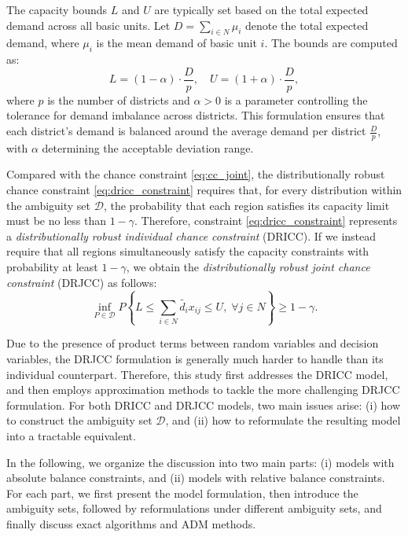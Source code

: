 \documentclass[preprint,12pt,authoryear]{elsarticle}
\begin{document}
The capacity bounds $L$ and $U$ are typically set based on the total expected demand across all basic units. Let $D = \sum_{i \in N} \mu_i$ denote the total expected demand, where $\mu_i$ is the mean demand of basic unit $i$. The bounds are computed as:
\begin{equation}
L = (1 - \alpha) \cdot \frac{D}{p}, \quad U = (1 + \alpha) \cdot \frac{D}{p},
\end{equation}
where $p$ is the number of districts and $\alpha > 0$ is a parameter controlling the tolerance for demand imbalance across districts. This formulation ensures that each district's demand is balanced around the average demand per district $\frac{D}{p}$, with $\alpha$ determining the acceptable deviation range.

Compared with the chance constraint \eqref{eq:cc_joint}, the distributionally robust chance constraint \eqref{eq:dricc_constraint} requires that, for every distribution within the ambiguity set $\mathcal{D}$, the probability that each region satisfies its capacity limit must be no less than $1-\gamma$. Therefore, constraint \eqref{eq:dricc_constraint} represents a \textit{distributionally robust individual chance constraint} (DRICC). If we instead require that all regions simultaneously satisfy the capacity constraints with probability at least $1-\gamma$, we obtain the \textit{distributionally robust joint chance constraint} (DRJCC) as follows:
\begin{equation}
\inf_{P \in \mathcal{D}} P \left\{L \leqslant \sum_{i \in N} \widetilde{d_i} x_{ij} \leqslant U, \; \forall j \in N \right\} \geqslant 1 - \gamma. \label{eq:drjcc_constraint}
\end{equation}

Due to the presence of product terms between random variables and decision variables, the DRJCC formulation is generally much harder to handle than its individual counterpart. Therefore, this study first addresses the DRICC model, and then employs approximation methods to tackle the more challenging DRJCC formulation. For both DRICC and DRJCC models, two main issues arise: (i) how to construct the ambiguity set $\mathcal{D}$, and (ii) how to reformulate the resulting model into a tractable equivalent. 

In the following, we organize the discussion into two main parts: (i) models with absolute balance constraints, and (ii) models with relative balance constraints. For each part, we first present the model formulation, then introduce the ambiguity sets, followed by reformulations under different ambiguity sets, and finally discuss exact algorithms and ADM methods.
\end{document}
